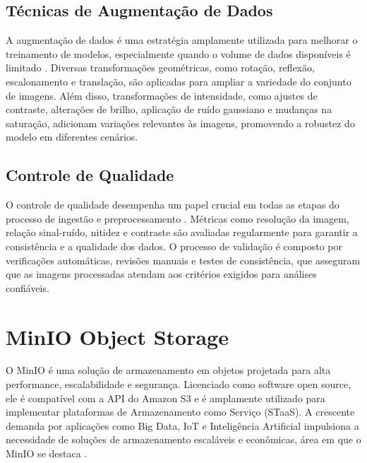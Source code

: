 \subsection{Técnicas de Augmentação de Dados}
A augmentação de dados é uma estratégia amplamente utilizada para melhorar o treinamento de modelos, especialmente quando o volume de dados disponíveis é limitado \cite{zhang2023augmentation}. Diversas transformações geométricas, como rotação, reflexão, escalonamento e translação, são aplicadas para ampliar a variedade do conjunto de imagens. Além disso, transformações de intensidade, como ajustes de contraste, alterações de brilho, aplicação de ruído gaussiano e mudanças na saturação, adicionam variações relevantes às imagens, promovendo a robustez do modelo em diferentes cenários.
\subsection{Controle de Qualidade}
O controle de qualidade desempenha um papel crucial em todas as etapas do processo de ingestão e preprocessamento \cite{chen2023quality}. Métricas como resolução da imagem, relação sinal-ruído, nitidez e contraste são avaliadas regularmente para garantir a consistência e a qualidade dos dados. O processo de validação é composto por verificações automáticas, revisões manuais e testes de consistência, que asseguram que as imagens processadas atendam aos critérios exigidos para análises confiáveis.


\section{MinIO Object Storage}
O MinIO é uma solução de armazenamento em objetos projetada para alta performance, escalabilidade e segurança. Licenciado como 
software open source, ele é compatível com a API do Amazon S3 e é amplamente utilizado para implementar plataformas de Armazenamento 
como Serviço (STaaS). A crescente demanda por aplicações como Big Data, IoT e Inteligência Artificial impulsiona a necessidade de 
soluções de armazenamento escaláveis e econômicas, área em que o MinIO se destaca \cite{minio_reference_architecture}. 


